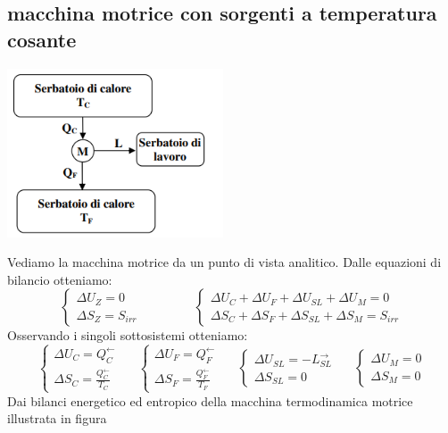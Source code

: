 \subsection{macchina motrice con sorgenti a temperatura cosante}
\begin{center}
    \includegraphics[height=5cm]{../NOTE SUGLI ESERCIZI/img4.PNG}
\end{center}
Vediamo la macchina motrice da un punto di vista analitico.\newline
Dalle equazioni di bilancio otteniamo:
\[
    \begin{cases}
        \Delta U_Z = 0\\ \Delta S_Z = S_{irr}
    \end{cases} \;\;\;\;\;\;\;\;\;\;\;\;\;\;\; \begin{cases}
        \Delta U_C + \Delta U_F + \Delta U_{SL} + \Delta U_M = 0 \\
        \Delta S_C + \Delta S_F + \Delta S_{SL} + \Delta S_M = S_{irr}
    \end{cases}
\]
Osservando i singoli sottosistemi otteniamo:
\[
    \begin{cases}
        \Delta U_C = Q_C^\leftarrow \\ \Delta S_C = \frac{Q_C^\leftarrow }{T_C}
    \end{cases} \;\;\;\;\; \begin{cases}
        \Delta U_F = Q_F^\leftarrow \\ \Delta S_F = \frac{Q_F^\leftarrow}{T_F}
    \end{cases} \;\;\;\;\; \begin{cases}
        \Delta U_{SL} = - L_{SL}^\rightarrow \\ \Delta S_{SL} = 0
    \end{cases} \;\;\;\;\; \begin{cases}
        \Delta U_M = 0\\ \Delta S_M = 0
    \end{cases}
\]
Dai bilanci energetico ed entropico della macchina termodinamica motrice illustrata in figura
